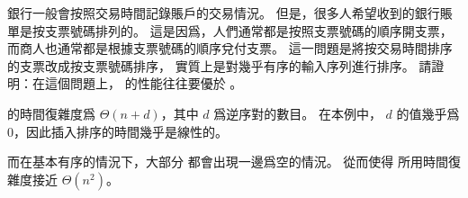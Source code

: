 \startEXERCISE
銀行一般會按照交易時間記錄賬戶的交易情況。
但是，很多人希望收到的銀行賬單是按支票號碼排列的。
這是因爲，人們通常都是按照支票號碼的順序開支票，
而商人也通常都是根據支票號碼的順序兌付支票。
這一問題是將按交易時間排序的支票改成按支票號碼排序，
實質上是對幾乎有序的輸入序列進行排序。
請證明：在這個問題上，  的性能往往要優於 。
\stopEXERCISE

\startANSWER
{} 的時間復雜度爲 $\Theta(n+d)$，其中 $d$ 爲逆序對的數目。
在本例中， $d$ 的值幾乎爲 $0$，因此插入排序的時間幾乎是線性的。

而在基本有序的情況下，大部分  都會出現一邊爲空的情況。
從而使得  所用時間復雜度接近 $\Theta(n^2)$。
\stopANSWER
